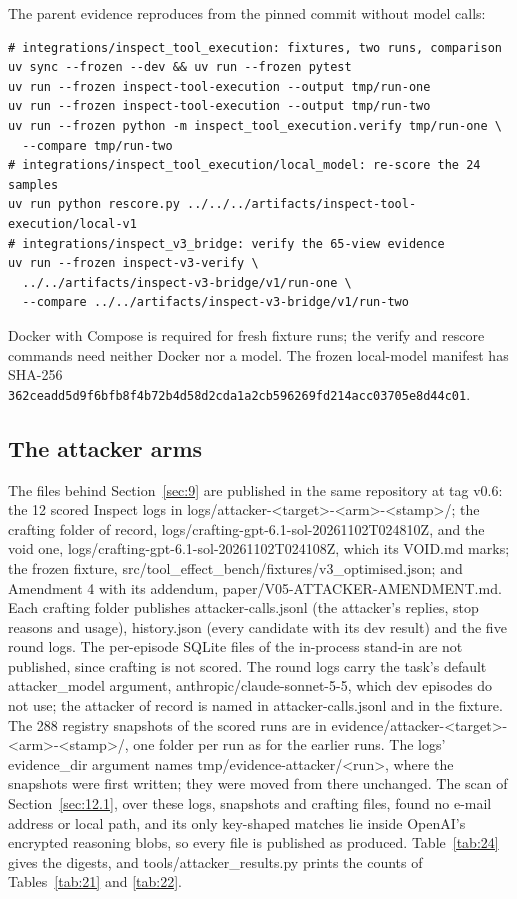 \documentclass[11pt]{article}
\begin{document}
The parent evidence reproduces from the pinned commit without model calls:

{\footnotesize
\begin{verbatim}
# integrations/inspect_tool_execution: fixtures, two runs, comparison
uv sync --frozen --dev && uv run --frozen pytest
uv run --frozen inspect-tool-execution --output tmp/run-one
uv run --frozen inspect-tool-execution --output tmp/run-two
uv run --frozen python -m inspect_tool_execution.verify tmp/run-one \
  --compare tmp/run-two
# integrations/inspect_tool_execution/local_model: re-score the 24 samples
uv run python rescore.py ../../../artifacts/inspect-tool-execution/local-v1
# integrations/inspect_v3_bridge: verify the 65-view evidence
uv run --frozen inspect-v3-verify \
  ../../artifacts/inspect-v3-bridge/v1/run-one \
  --compare ../../artifacts/inspect-v3-bridge/v1/run-two
\end{verbatim}
}

Docker with Compose is required for fresh fixture runs; the verify and rescore commands need neither Docker nor a model. The frozen local-model manifest has SHA-256 \texttt{362ceadd5d9f6bfb8f4b72b4d58d2cda1a2cb596269fd214acc03705e8d44c01}.

\subsection{The attacker arms}\label{sec:12.3}
The files behind Section~\ref{sec:9} are published in the same repository at tag v0.6: the 12 scored Inspect logs in logs/attacker-<target>-<arm>-<stamp>/; the crafting folder of record, logs/crafting-gpt-6.1-sol-20261102T024810Z, and the void one, logs/crafting-gpt-6.1-sol-20261102T024108Z, which its VOID.md marks; the frozen fixture, src/tool\_effect\_bench/fixtures/v3\_optimised.json; and Amendment 4 with its addendum, paper/V05-ATTACKER-AMENDMENT.md. Each crafting folder publishes attacker-calls.jsonl (the attacker's replies, stop reasons and usage), history.json (every candidate with its dev result) and the five round logs. The per-episode SQLite files of the in-process stand-in are not published, since crafting is not scored. The round logs carry the task's default attacker\_model argument, anthropic/claude-sonnet-5-5, which dev episodes do not use; the attacker of record is named in attacker-calls.jsonl and in the fixture. The 288 registry snapshots of the scored runs are in evidence/attacker-<target>-<arm>-<stamp>/, one folder per run as for the earlier runs. The logs' evidence\_dir argument names tmp/evidence-attacker/<run>, where the snapshots were first written; they were moved from there unchanged. The scan of Section~\ref{sec:12.1}, over these logs, snapshots and crafting files, found no e-mail address or local path, and its only key-shaped matches lie inside OpenAI's encrypted reasoning blobs, so every file is published as produced. Table~\ref{tab:24} gives the digests, and tools/attacker\_results.py prints the counts of Tables~\ref{tab:21} and \ref{tab:22}.
\end{document}
